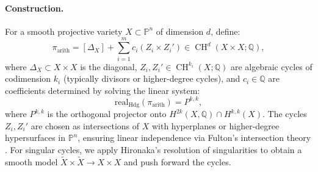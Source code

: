 \documentclass[11pt]{article}
\DeclareMathOperator{\CH}{CH}
\begin{document}
\paragraph{Construction.}
For a smooth projective variety \(X \subset \mathbb{P}^n\) of dimension \(d\), define:
\[
\pi_{\mathrm{arith}} = [\Delta_X] + \sum_{i=1}^m c_i (Z_i \times Z_i') \in \CH^d(X \times X; \mathbb{Q}),
\]
where \(\Delta_X \subset X \times X\) is the diagonal, \(Z_i, Z_i' \in \CH^{k_i}(X; \mathbb{Q})\) are algebraic cycles of codimension \(k_i\) (typically divisors or higher-degree cycles), and \(c_i \in \mathbb{Q}\) are coefficients determined by solving the linear system:
\[
\mathrm{real}_{\mathrm{Hdg}}(\pi_{\mathrm{arith}}) = P^{k,k},
\]
where \(P^{k,k}\) is the orthogonal projector onto \(H^{2k}(X, \mathbb{Q}) \cap H^{k,k}(X)\). The cycles \(Z_i, Z_i'\) are chosen as intersections of \(X\) with hyperplanes or higher-degree hypersurfaces in \(\mathbb{P}^n\), ensuring linear independence via Fulton’s intersection theory \cite{fulton1984}. For singular cycles, we apply Hironaka’s resolution of singularities \cite{hironaka1964} to obtain a smooth model \(\tilde{X} \times \tilde{X} \to X \times X\) and push forward the cycles.
\end{document}
